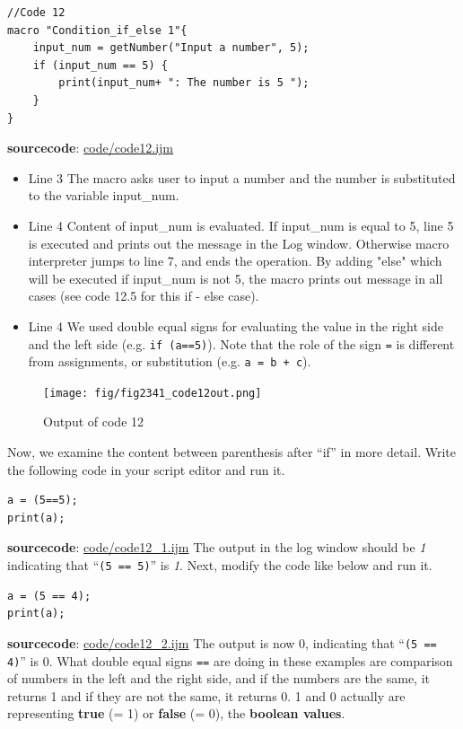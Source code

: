 \documentclass[11pt,a4paper,oneside]{report}
\newcommand{\ilcom}[1]{\texttt{\small#1}}
\begin{document}
\begin{lstlisting}[morekeywords={*, if}]
//Code 12
macro "Condition_if_else 1"{
	input_num = getNumber("Input a number", 5);
	if (input_num == 5) {
		print(input_num+ ": The number is 5 ");
	} 
}
\end{lstlisting}
\textbf{sourcecode}: \href{http://www.example.com/contents}{code/code12.ijm}
\begin{itemize}
\item Line 3 The macro asks user to input a number and the number is substituted to the variable input\_num.
\item Line 4 Content of input\_num is evaluated. If input\_num is equal to 5, line 5 is executed and prints out the message in the Log window. Otherwise macro interpreter jumps to line 7, and ends the operation.  By adding "else" which will be executed if input\_num is not 5, the macro prints out message in all cases (see code 12.5 for this if - else case). 
\item Line 4 We used double equal signs for evaluating the value in the right side and the left side (e.g. \ilcom{if (a==5)}). 
Note that the role of the sign \ilcom{=} is different from assignments, or substitution (e.g. \ilcom{a = b + c}).
\end{itemize}
\begin{figure}[htbp]
\begin{center}
\texttt{[image: fig/fig2341\_code12out.png]}
\caption{Output of code 12}
\label{fig:code12 output}
\end{center}
\end{figure} 

Now, we examine the content between 
parenthesis after ``if'' in more detail. 
Write the following code in your script editor and run it.

\begin{lstlisting}[morekeywords={*, ==}]
a = (5==5);
print(a);

\end{lstlisting}
\textbf{sourcecode}: \href{http://www.example.com/contents}{code/code12\_1.ijm}
The output in the log window should be \textit{1} indicating that ``\ilcom{(5 ==
5)}'' is \textit{1}. Next, modify the code like below and run it.

\begin{lstlisting}[morekeywords={*, ==}]
a = (5 == 4);
print(a);

\end{lstlisting}
\textbf{sourcecode}: \href{http://www.example.com/contents}{code/code12\_2.ijm}
The output is now 0, indicating that ``\ilcom{(5 == 4)}'' is
0.
What double equal signs \ilcom{==} are doing in these
examples are comparison of numbers in the left and the right side, and if
the numbers are the same, it returns 1 and if they are not the same, it returns 0. 1 and
0 actually are representing \textbf{true} (= 1) or \textbf{false} (= 0), the
\textbf{boolean values}.
\end{document}
